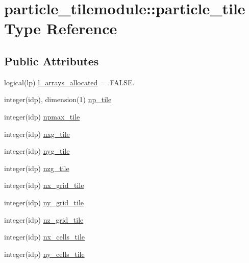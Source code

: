 \hypertarget{structparticle__tilemodule_1_1particle__tile}{}\section{particle\+\_\+tilemodule\+:\+:particle\+\_\+tile Type Reference}
\label{structparticle__tilemodule_1_1particle__tile}
\subsection*{Public Attributes}
\begin{DoxyCompactItemize}
\item 
logical(lp) \hyperlink{structparticle__tilemodule_1_1particle__tile_ad56d208213de506ceba36b73672aaa71}{l\+\_\+arrays\+\_\+allocated} = .F\+A\+L\+S\+E.
\item 
integer(idp), dimension(1) \hyperlink{structparticle__tilemodule_1_1particle__tile_ab9bcba3f2500e14759770e22962bfa95}{np\+\_\+tile}
\item 
integer(idp) \hyperlink{structparticle__tilemodule_1_1particle__tile_a76a0491ea4059cb2c71d4e561cebec62}{npmax\+\_\+tile}
\item 
integer(idp) \hyperlink{structparticle__tilemodule_1_1particle__tile_afa9d66b81da6da5af3cdf5de32e6b3f8}{nxg\+\_\+tile}
\item 
integer(idp) \hyperlink{structparticle__tilemodule_1_1particle__tile_a309ec6aa69081c317fda9aa4497c2f9f}{nyg\+\_\+tile}
\item 
integer(idp) \hyperlink{structparticle__tilemodule_1_1particle__tile_a96340a1208579adbab7ef4cf5d3c94bd}{nzg\+\_\+tile}
\item 
integer(idp) \hyperlink{structparticle__tilemodule_1_1particle__tile_aa8bef08bcd167e64ae1839891ba5a924}{nx\+\_\+grid\+\_\+tile}
\item 
integer(idp) \hyperlink{structparticle__tilemodule_1_1particle__tile_a7009b0860eadb148f132c6dea3f524cd}{ny\+\_\+grid\+\_\+tile}
\item 
integer(idp) \hyperlink{structparticle__tilemodule_1_1particle__tile_a70f14a99d2d1391d5e1b4d4a092c46f5}{nz\+\_\+grid\+\_\+tile}
\item 
integer(idp) \hyperlink{structparticle__tilemodule_1_1particle__tile_a8267ff1b30344b4ba328ddae88c40ad7}{nx\+\_\+cells\+\_\+tile}
\item 
integer(idp) \hyperlink{structparticle__tilemodule_1_1particle__tile_a34ecb077581b858b6127e54440d238e6}{ny\+\_\+cells\+\_\+tile}

\end{DoxyCompactItemize}

